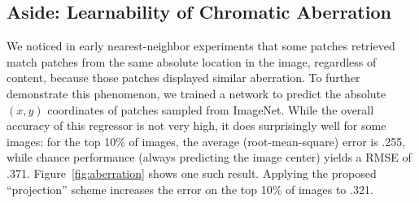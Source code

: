\documentclass[10pt,twocolumn,letterpaper]{article}
\begin{document}
\subsection{Aside: Learnability of Chromatic Aberration}\label{sec:aberration}
\vspace{-0.05in}
We noticed in early nearest-neighbor experiments that some patches retrieved match patches from the same absolute location in the image, regardless of content, because those patches displayed similar aberration.  %
To further demonstrate this phenomenon, we trained a network 
to predict the absolute $(x,y)$ coordinates of patches sampled from ImageNet. While the overall accuracy of this regressor is not very high, it does surprisingly well for some images: for the top 10\% of images, the average (root-mean-square) error is .255, while chance performance (always predicting the image center) yields a RMSE of .371.  Figure~\ref{fig:aberration} shows one such result. %
Applying the proposed ``projection'' scheme increases the error on the top 10\% of images to .321.  
\end{document}

